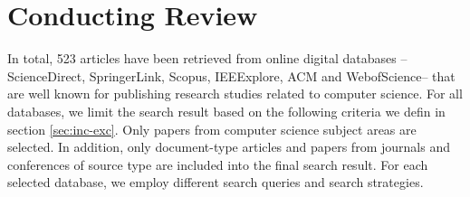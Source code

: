 \section{Conducting Review}
In total, 523 articles have been retrieved from online digital databases -- ScienceDirect, SpringerLink, Scopus, IEEExplore, ACM and WebofScience-- that are well known for publishing research studies related to computer science. 
For all databases, we limit the search result based on the following criteria we defin in section \ref{sec:inc-exc}. Only papers from computer science subject areas are selected. In addition, only document-type articles and papers from journals and conferences of source type are included into the final search result. For each selected database, we employ different search queries and search strategies.










